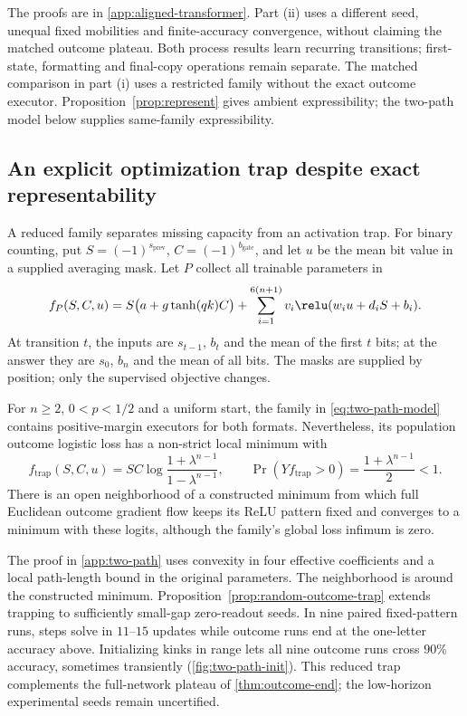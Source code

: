 The proofs are in \cref{app:aligned-transformer}. Part (ii) uses a different seed,
unequal fixed mobilities and finite-accuracy convergence, without claiming the
matched outcome plateau. Both process results learn recurring transitions;
first-state, formatting and final-copy operations remain separate.
The matched comparison in part (i) uses a restricted family without the exact
outcome executor. Proposition~\ref{prop:represent} gives ambient expressibility;
the two-path model below supplies same-family expressibility.

\subsection{An explicit optimization trap despite exact representability}
\label{sec:two-path-trap}
A reduced family separates missing capacity from an activation trap. For binary
counting, put $S=(-1)^{s_{\mathrm{prev}}}$, $C=(-1)^{b_{\mathrm{gate}}}$,
and let $u$ be the mean bit value in a supplied averaging mask. Let $P$ collect all trainable parameters in
\begin{equation}
 f_P(S,C,u)=S\bigl(a+g\tanh(qk)C\bigr)
 +\sum_{i=1}^{6(n+1)}v_i\relu(w_i u+d_iS+b_i).
 \label{eq:two-path-model}
\end{equation}
At transition $t$, the inputs are $s_{t-1}$, $b_t$ and the mean of the first
$t$ bits; at the answer they are $s_0$, $b_n$ and the mean of all bits.
The masks are supplied by position; only the supervised objective changes.

\begin{proposition}
\label{prop:two-path-trap}
For $n\ge2$, $0<p<1/2$ and a uniform start, the family in
\cref{eq:two-path-model} contains positive-margin executors for both formats.
Nevertheless, its population outcome logistic loss has a non-strict local minimum
with
\[
 f_{\mathrm{trap}}(S,C,u)=S C\log\frac{1+\lambda^{n-1}}{1-\lambda^{n-1}},
 \qquad \Pr(Yf_{\mathrm{trap}}>0)=\frac{1+\lambda^{n-1}}2<1.
\]
There is an open neighborhood of a constructed minimum from which full
Euclidean outcome gradient flow keeps its ReLU pattern fixed and converges
to a minimum with these logits, although the family's global loss infimum is zero.
\end{proposition}
The proof in \cref{app:two-path} uses convexity in four effective coefficients
and a local path-length bound in the original parameters. The neighborhood is
around the constructed minimum. Proposition~\ref{prop:random-outcome-trap}
extends trapping to sufficiently small-gap zero-readout seeds. In nine paired fixed-pattern runs, steps solve in $11$--$15$ updates while
outcome runs end at the one-letter accuracy above. Initializing kinks in range
lets all nine outcome runs cross $90\%$ accuracy, sometimes transiently
(\cref{fig:two-path-init}). This reduced trap complements the full-network plateau
of \cref{thm:outcome-end}; the low-horizon experimental seeds remain uncertified.

